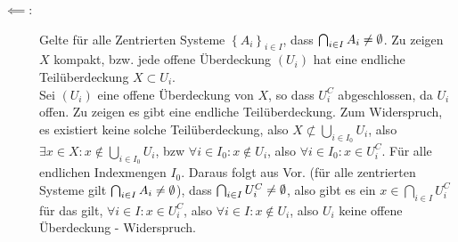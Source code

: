 \documentclass[sectionformat=aufgabe]{gadsescript}
\begin{document}
\begin{description}
\begin{description}
				
			\item[$ \impliedby  $:] Gelte für alle Zentrierten Systeme $ \left\{ A_i \right\} _{i \in I}  $, dass $ \bigcap_{i \in  I} A_i \neq \emptyset  $. Zu zeigen $ X $ kompakt, bzw. jede offene Überdeckung $ (U_i) $ hat eine endliche Teilüberdeckung $ X \subset U_i $.\\
				Sei $ (U_i) $ eine offene Überdeckung von $ X $, so dass $ U_i^C $ abgeschlossen, da $ U_i $ offen.
				Zu zeigen es gibt eine endliche Teilüberdeckung.
				Zum Widerspruch, es existiert keine solche Teilüberdeckung, also $ X \not \subset \bigcup_{i \in I_0} U_i $, also $ \exists x \in X : x \not\in  \bigcup_{i \in I_0} U_i $, bzw $ \forall i \in I_0 : x \not\in U_i $, also $ \forall i \in I_0 : x \in U_i^C $.
				Für alle endlichen Indexmengen $ I_0 $.
				Daraus folgt aus Vor. (für alle zentrierten Systeme gilt $ \bigcap_{i \in  I} A_i \neq \emptyset  $), dass $ \bigcap_{i \in  I} U_i^C \neq \emptyset  $, also gibt es ein $ x \in \bigcap_{i \in  I} U_i^C  $ für das gilt, $ \forall i \in I : x \in U_i^C $, also $ \forall i \in I : x \not\in U_i $, also $ U_i $ keine offene Überdeckung - Widerspruch.
		\end{description}
		
\end{description}
\end{document}
